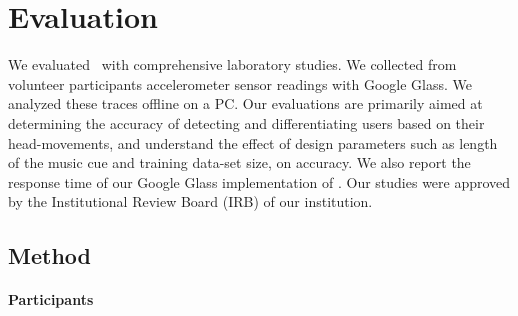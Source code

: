 \section{Evaluation}\label{sec:results}

We evaluated \systemname~with comprehensive laboratory studies.
We collected from volunteer participants accelerometer sensor readings with Google Glass.
We analyzed these traces offline on a PC.
Our evaluations are primarily aimed at determining the accuracy of detecting 
and differentiating users based on their head-movements, and understand 
the effect of design parameters such as length of the music cue and training 
data-set size, on accuracy. We also report the response time of our Google 
Glass implementation of \systemname.
Our studies were approved by the Institutional Review Board (IRB) of our 
institution.

\subsection{Method}

\paragraph{Participants}

